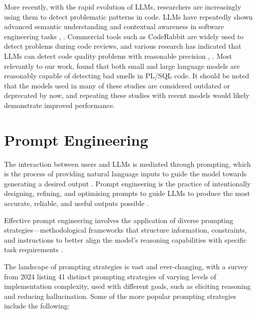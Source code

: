 More recently, with the rapid evolution of LLMs, researchers are increasingly using them to detect problematic patterns in code. LLMs have repeatedly shown advanced semantic understanding and contextual awareness in software engineering tasks , . Commercial tools such as CodeRabbit  are widely used to detect problems during code reviews, and various research has indicated that LLMs can detect code quality problems with reasonable precision , . Most relevantly to our work,  found that both small and large language models are reasonably capable of detecting bad smells in PL/SQL code. It should be noted that the models used in many of these studies are considered outdated or deprecated by now, and repeating these studies with recent models would likely demonstrate improved performance.

\section{Prompt Engineering}\label{sec:promptEngineering}

The interaction between users and LLMs is mediated through prompting, which is the process of providing natural language inputs to guide the model towards generating a desired output \cite{DBLP:journals/csur/LiuYFJHN23}. Prompt engineering is the practice of intentionally designing, refining, and optimising prompts to guide LLMs to produce the most accurate, reliable, and useful outputs possible \cite{DBLP:journals/csur/LiuYFJHN23}.

Effective prompt engineering involves the application of diverse prompting strategies—methodological frameworks that structure information, constraints, and instructions to better align the model's reasoning capabilities with specific task requirements \cite{DBLP:journals/corr/abs-2302-11382}.

The landscape of prompting strategies is vast and ever-changing, with a survey from 2024  listing \num{41} distinct prompting strategies of varying levels of implementation complexity, used with different goals, such as eliciting reasoning and reducing hallucination. Some of the more popular prompting strategies include the following:

